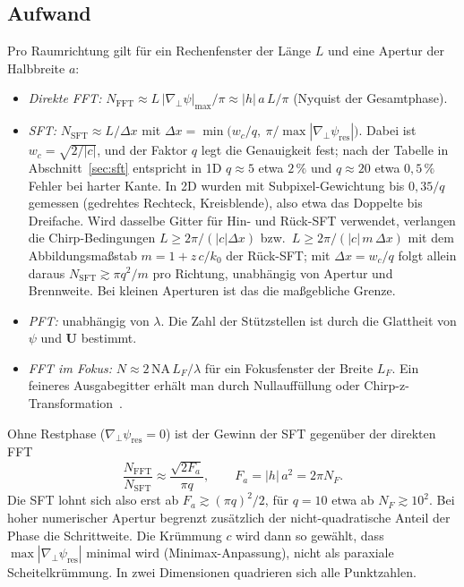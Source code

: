 \documentclass[11pt,a4paper]{scrartcl}
\theoremstyle{insightstyle}
\newcommand{\grad}{\nabla_{\!\perp}}
\newcommand{\NA}{\mathrm{NA}}
\begin{document}
\subsection{Aufwand}\label{sec:cost}
Pro Raumrichtung gilt für ein Rechenfenster der Länge $L$ und eine Apertur der Halbbreite $a$:
\begin{itemize}
    \item \emph{Direkte FFT:} $N_\text{FFT}\approx L\,|\grad\psi|_{\max}/\pi\approx|h|\,a\,L/\pi$ (Nyquist der Gesamtphase).
    \item \emph{SFT:} $N_\text{SFT}\approx L/\Delta x$ mit $\Delta x=\min\big(w_c/q,\ \pi/\max|\grad\psi_\text{res}|\big)$. Dabei ist $w_c=\sqrt{2/|c|}$, und der Faktor $q$ legt die Genauigkeit fest; nach der Tabelle in Abschnitt~\ref{sec:sft} entspricht in 1D $q\approx5$ etwa $2\,\%$ und $q\approx20$ etwa $0{,}5\,\%$ Fehler bei harter Kante. In 2D wurden mit Subpixel-Gewichtung bis $0{,}35/q$ gemessen (gedrehtes Rechteck, Kreisblende), also etwa das Doppelte bis Dreifache. Wird dasselbe Gitter für Hin- und Rück-SFT verwendet, verlangen die Chirp-Bedingungen $L\ge2\pi/(|c|\Delta x)$ bzw.\ $L\ge2\pi/(|c|\,m\,\Delta x)$ mit dem Abbildungsmaßstab $m=1+z\,c/k_0$ der Rück-SFT; mit $\Delta x=w_c/q$ folgt allein daraus $N_\text{SFT}\gtrsim\pi q^2/m$ pro Richtung, unabhängig von Apertur und Brennweite. Bei kleinen Aperturen ist das die maßgebliche Grenze.
    \item \emph{PFT:} unabhängig von $\lambda$. Die Zahl der Stützstellen ist durch die Glattheit von $\psi$ und $\bm U$ bestimmt.
    \item \emph{FFT im Fokus:} $N\approx2\,\NA\,L_F/\lambda$ für ein Fokusfenster der Breite $L_F$. Ein feineres Ausgabegitter erhält man durch Nullauffüllung oder Chirp-z-Transformation~\cite{leutenegger2006}.
\end{itemize}
Ohne Restphase ($\grad\psi_\text{res}=0$) ist der Gewinn der SFT gegenüber der direkten FFT
\begin{equation}
    \frac{N_\text{FFT}}{N_\text{SFT}} \approx \frac{\sqrt{2F_a}}{\pi q},\qquad F_a=|h|\,a^2=2\pi N_F .
    \label{eq:sft_gain}
\end{equation}
Die SFT lohnt sich also erst ab $F_a\gtrsim(\pi q)^2/2$, für $q=10$ etwa ab $N_F\gtrsim10^2$. Bei hoher numerischer Apertur begrenzt zusätzlich der nicht-quadratische Anteil der Phase die Schrittweite. Die Krümmung $c$ wird dann so gewählt, dass $\max|\grad\psi_\text{res}|$ minimal wird (Minimax-Anpassung), nicht als paraxiale Scheitelkrümmung. In zwei Dimensionen quadrieren sich alle Punktzahlen.
\end{document}
